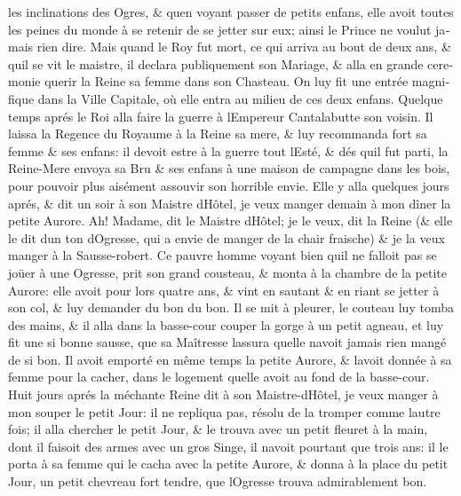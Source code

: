 \documentclass[14pt,a4paper]{memoir}
\begin{document}
{{\begin{otherlanguage}{french}
les inclinations des Ogres, \& qu\textquotesingle en voyant passer de
petits enfans, elle avoit toutes les peines du monde à se retenir de se
jetter sur eux; ainsi le Prince ne voulut jamais rien dire. Mais quand
le Roy fut mort, ce qui arriva au bout de deux ans, \&
qu\textquotesingle il se vit le maistre, il declara publiquement son
Mariage, \& alla en grande ceremonie querir la Reine sa femme dans son
Chasteau. On luy fit une entrée magnifique dans la Ville Capitale, où
elle entra au milieu de ces deux enfans. Quelque temps aprés le Roi alla
faire la guerre à l\textquotesingle Empereur Cantalabutte son voisin. Il
laissa la Regence du Royaume à la Reine sa mere, \& luy recommanda fort
sa femme \& ses enfans: il devoit estre à la guerre tout
l\textquotesingle Esté, \& dés qu\textquotesingle il fut parti, la
Reine-Mere envoya sa Bru \& ses enfans à une maison de campagne dans les
bois, pour pouvoir plus aisément assouvir son horrible envie. Elle y
alla quelques jours aprés, \& dit un soir à son Maistre
d\textquotesingle Hôtel, je veux manger demain à mon dîner la petite
Aurore. Ah! Madame, dit le Maistre d\textquotesingle Hôtel; je le veux,
dit la Reine (\& elle le dit d\textquotesingle un ton
d\textquotesingle Ogresse, qui a envie de manger de la chair fraische)
\& je la veux manger à la Sausse-robert. Ce pauvre homme voyant bien
qu\textquotesingle il ne falloit pas se joüer à une Ogresse, prit son
grand cousteau, \& monta à la chambre de la petite Aurore: elle avoit
pour lors quatre ans, \& vint en sautant \& en riant se jetter à son
col, \& luy demander du bon du bon. Il se mit à pleurer, le couteau luy
tomba des mains, \& il alla dans la basse-cour couper la gorge à un
petit agneau, et luy fit une si bonne sausse, que sa Maîtresse
l\textquotesingle assura qu\textquotesingle elle n\textquotesingle avoit
jamais rien mangé de si bon. Il avoit emporté en même temps la petite
Aurore, \& l\textquotesingle avoit donnée à sa femme pour la cacher,
dans le logement qu\textquotesingle elle avoit au fond de la basse-cour.
Huit jours aprés la méchante Reine dit à son
Maistre-d\textquotesingle Hôtel, je veux manger à mon souper le petit
Jour: il ne repliqua pas, résolu de la tromper comme
l\textquotesingle autre fois; il alla chercher le petit Jour, \& le
trouva avec un petit fleuret à la main, dont il faisoit des armes avec
un gros Singe, il n\textquotesingle avoit pourtant que trois ans: il le
porta à sa femme qui le cacha avec la petite Aurore, \& donna à la place
du petit Jour, un petit chevreau fort tendre, que
l\textquotesingle Ogresse trouva admirablement bon.


\end{otherlanguage}}}
\end{document}
